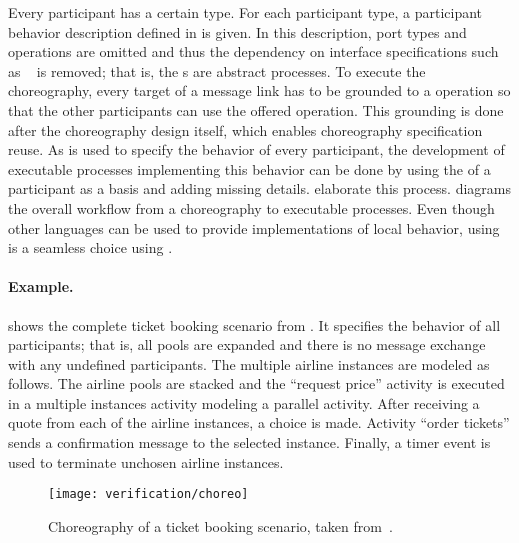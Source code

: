 Every participant has a certain type. For each participant type, a participant behavior description defined in  is given. In this description, port types and operations are omitted and thus the dependency on interface specifications such as ~\cite{standard_wsdl} is removed; that is, the s are abstract  processes. To execute the choreography, every target of a message link has to be grounded to a  operation so that the other participants can use the offered operation. This grounding is done after the choreography design itself, which enables choreography specification reuse. As  is used to specify the behavior of every participant, the development of executable  processes implementing this behavior can be done by using the  of a participant as a basis and adding missing details. \citet{ReimannKDL_2008_tr0807} elaborate this process.  diagrams the overall workflow from a \bpelchor{} choreography to executable  processes. Even though other languages can be used to provide implementations of local behavior, using  is a seamless choice using \bpelchor{}.

\enlargethispage*{2\baselineskip}

\paragraph{Example.}

 shows the complete ticket booking scenario from \cite{DeckerKLW_2007_icws}. It specifies the behavior of all participants; that is, all pools are expanded and there is no message exchange with any undefined participants. The multiple airline instances are modeled as follows. The airline pools are stacked and the ``request price'' activity is executed in a multiple instances activity modeling a parallel  activity. After receiving a quote from each of the airline instances, a choice is made. Activity ``order tickets'' sends a confirmation message to the selected instance. Finally, a timer event is used to terminate unchosen airline instances.

\begin{figure}
\centering
\texttt{[image: verification/choreo]}
\caption{Choreography of a ticket booking scenario, taken from~\cite{DeckerKLW_2007_icws}.}\label{fig:broken}
\end{figure}





